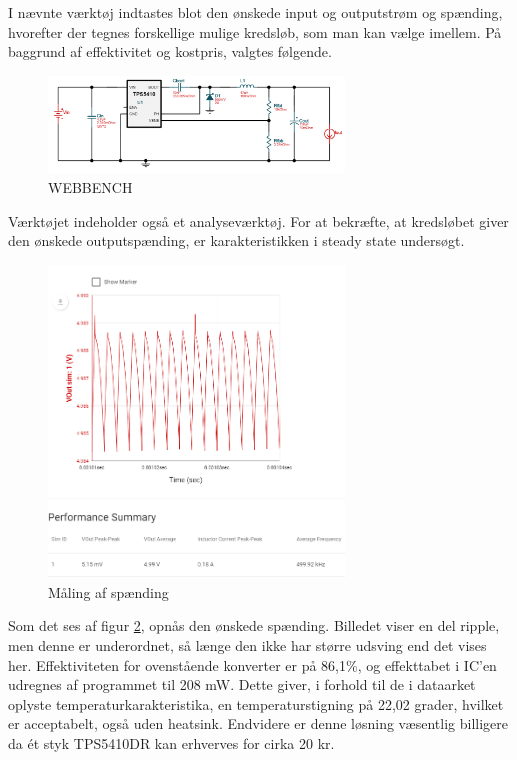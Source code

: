I nævnte værktøj indtastes blot den ønskede input og outputstrøm og spænding, hvorefter der tegnes forskellige mulige kredsløb, som man kan vælge imellem. På baggrund af effektivitet og kostpris, valgtes følgende. 

\begin{figure}[h]
  \centering
  \includegraphics[width=0.7\textwidth]{./figurer/j4.png}
  \caption{WEBBENCH}
  \label{fig:j4}
\end{figure}

Værktøjet indeholder også et analyseværktøj. For at bekræfte, at kredsløbet giver den ønskede outputspænding, er  karakteristikken i steady state undersøgt.
\clearpage
\begin{figure}[h]
  \centering
  \includegraphics[width=0.7\textwidth]{./figurer/j5.png}
  \caption{Måling af spænding}
  \label{fig:j5}
\end{figure}

Som det ses af figur \ref{fig:j5}, opnås den ønskede spænding. Billedet viser en del ripple, men denne er underordnet, så længe den ikke har større udsving end det vises her. Effektiviteten for ovenstående konverter er på 86,1\%, og effekttabet i IC'en udregnes af programmet til 208 mW. Dette giver, i forhold til de i dataarket oplyste temperaturkarakteristika, en temperaturstigning på 22,02 grader, hvilket er acceptabelt, også uden heatsink. Endvidere er denne løsning væsentlig billigere da ét styk TPS5410DR kan erhverves for cirka 20 kr. 

